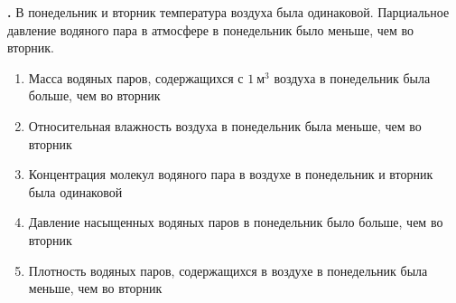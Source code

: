 \documentclass[12pt,a4paper]{article}
\newif\ifShowSolutions
\newcounter{banktask}
\newcommand{\BankTask}[3]{%
  \refstepcounter{banktask}%
  \Needspace{35mm}\par\medskip\noindent\begin{minipage}{\linewidth}%
  \noindent\textbf{\thebanktask.}\quad #2\par
  \ifShowSolutions
    #3\par
    \ifdefined\TutorEdition
      \ifcsname TutorSource#1\endcsname
        \smallskip{\small\csname TutorSource#1\endcsname\par}%
      \fi
    \fi
  \fi
  \end{minipage}\par\medskip
}
\begin{document}
\BankTask{DE8B36}{
В понедельник и вторник температура воздуха была одинаковой. Парциальное давление водяного пара в атмосфере в понедельник было меньше, чем во вторник.
\begin{enumerate}
\item Масса водяных паров, содержащихся с $1\ \text{м}^{3}$ воздуха в понедельник была больше, чем во вторник
\item Относительная влажность воздуха в понедельник была меньше, чем во вторник
\item Концентрация молекул водяного пара в воздухе в понедельник и вторник была одинаковой
\item Давление насыщенных водяных паров в понедельник было больше, чем во вторник
\item Плотность водяных паров, содержащихся в воздухе в понедельник была меньше, чем во вторник
\end{enumerate}
}{
\smallskip\noindent\textbf{Решение от GPT}\par
При одинаковой температуре $p_{\text{нас}}(T)$ одинаково в оба дня. По формулам $\varphi=p/p_{\text{нас}}$, $n=p/(kT)$ и $\rho=Mp/(RT)$ меньшему парциальному давлению соответствуют меньшие влажность, концентрация и плотность пара.
\begin{enumerate}
\item Неверно: масса пара в $1\ \text{м}^{3}$ в понедельник меньше.
\item Верно: $\varphi_{\text{пн}}<\varphi_{\text{вт}}$.
\item Неверно: $n_{\text{пн}}<n_{\text{вт}}$.
\item Неверно: давления насыщенного пара одинаковы.
\item Верно: $\rho_{\text{пн}}<\rho_{\text{вт}}$.
\end{enumerate}
Ответ: $25$.
}
\end{document}
